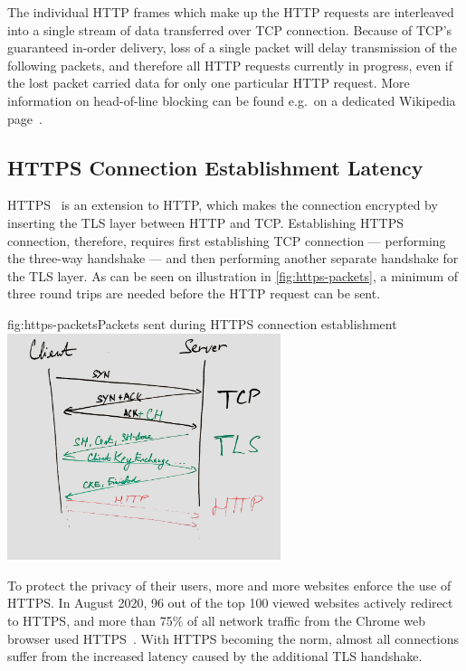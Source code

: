 The individual HTTP frames which make up the HTTP requests are interleaved into a single stream of
data transferred over TCP connection. Because of TCP's guaranteed in-order delivery, loss of a
single packet will delay transmission of the following packets, and therefore all HTTP requests
currently in progress, even if the lost packet carried data for only one particular HTTP request.
More information on head-of-line blocking can be found e.g.\ on a dedicated Wikipedia
page~\cite{wiki:head-of-line_blocking}.

\subsection*{HTTPS Connection Establishment Latency}
HTTPS~\cite{rfc2818} is an extension to HTTP, which makes the connection encrypted by inserting the
TLS layer between HTTP and TCP\@. Establishing HTTPS connection, therefore, requires first
establishing TCP connection --- performing the three-way handshake --- and then performing another
separate handshake for the TLS layer. As can be seen on illustration in
\autoref{fig:https-packets}, a minimum of three round trips are needed before the HTTP request
can be sent.

\begin{myFigure}{fig:https-packets}{Packets sent during HTTPS connection establishment}
  \includegraphics[width=0.6\textwidth]{img/01-https-connection-packets}
\end{myFigure}

To protect the privacy of their users, more and more websites enforce the use of HTTPS\@.
In August 2020, 96 out of the top 100 viewed websites actively redirect to HTTPS, and more than 75\%
of all network traffic from the Chrome web browser used HTTPS~\cite{googleTransparency}. With HTTPS
becoming the norm, almost all connections suffer from the increased latency caused by the
additional TLS handshake.

